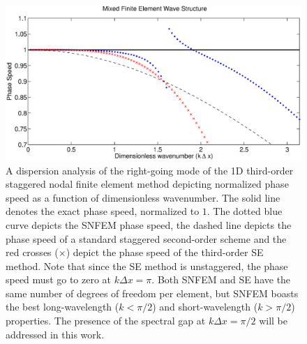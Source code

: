 \documentclass[11pt]{article}
\begin{document}
\begin{figure}
\begin{center}
\includegraphics[width=5in]{HFEM_ThirdOrder}
\end{center}
\caption{A dispersion analysis of the right-going mode of the 1D third-order staggered nodal finite element method depicting normalized phase speed as a function of dimensionless wavenumber.  The solid line denotes the exact phase speed, normalized to $1$.  The dotted blue curve depicts the SNFEM phase speed, the dashed line depicts the phase speed of a standard staggered second-order scheme and the red crosses ($\times$) depict the phase speed of the third-order SE method.  Note that since the SE method is unstaggered, the phase speed must go to zero at $k \Delta x = \pi$.  Both SNFEM and SE have the same number of degrees of freedom per element, but SNFEM boasts the best long-wavelength ($k < \pi/2$) and short-wavelength ($k > \pi/2$) properties.  The presence of the spectral gap at $k \Delta x = \pi / 2$ will be addressed in this work.} \label{fig:SNFEMEigenstructure}
\end{figure}
\end{document}
